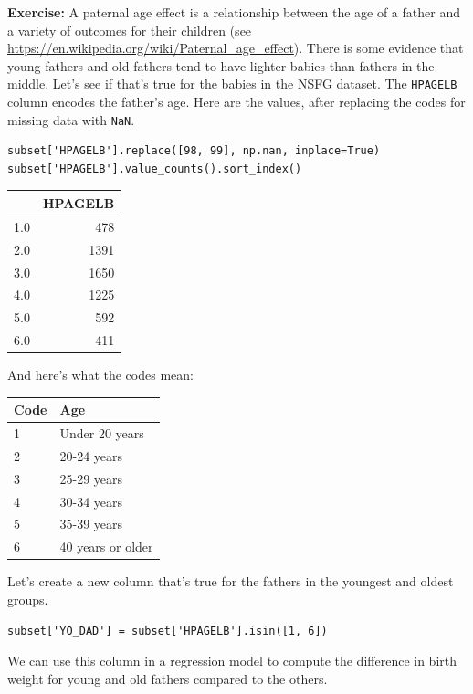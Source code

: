 \textbf{Exercise:} A paternal age effect is a relationship between the
age of a father and a variety of outcomes for their children (see
\url{https://en.wikipedia.org/wiki/Paternal_age_effect}). There is some
evidence that young fathers and old fathers tend to have lighter babies
than fathers in the middle. Let's see if that's true for the babies in
the NSFG dataset. The \passthrough{\lstinline!HPAGELB!} column encodes
the father's age. Here are the values, after replacing the codes for
missing data with \passthrough{\lstinline!NaN!}.

\begin{lstlisting}[]
subset['HPAGELB'].replace([98, 99], np.nan, inplace=True)
subset['HPAGELB'].value_counts().sort_index()
\end{lstlisting}

\begin{tabular}{lr}
\midrule
{} &  HPAGELB \\
\midrule
1.0 &      478 \\
2.0 &     1391 \\
3.0 &     1650 \\
4.0 &     1225 \\
5.0 &      592 \\
6.0 &      411 \\
\midrule
\end{tabular}

And here's what the codes mean:

\begin{longtable}[]{@{}ll@{}}
\midrule()
Code & Age \\
\midrule()
\endhead
1 & Under 20 years \\
2 & 20-24 years \\
3 & 25-29 years \\
4 & 30-34 years \\
5 & 35-39 years \\
6 & 40 years or older \\
\midrule()
\end{longtable}

Let's create a new column that's true for the fathers in the youngest
and oldest groups.

\begin{lstlisting}[]
subset['YO_DAD'] = subset['HPAGELB'].isin([1, 6])
\end{lstlisting}

We can use this column in a regression model to compute the difference
in birth weight for young and old fathers compared to the others.

